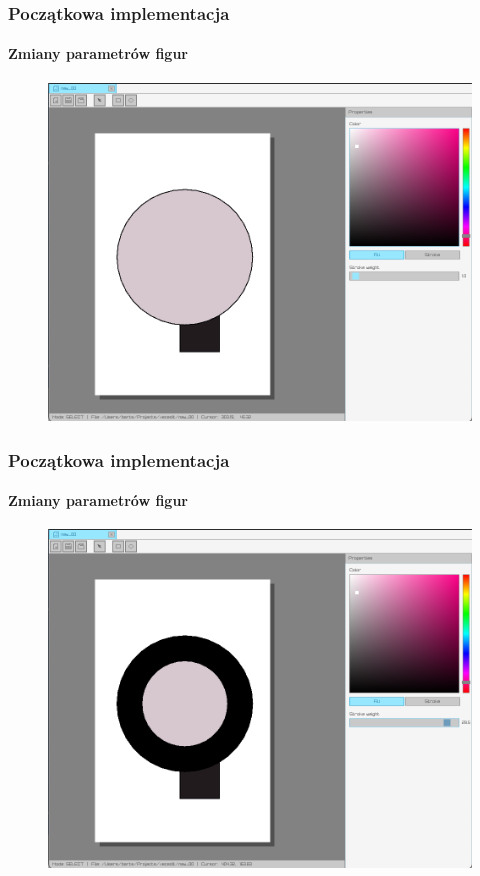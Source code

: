 \documentclass[
	11pt,]{beamer}
\begin{document}
\begin{frame}
	\frametitle{Początkowa implementacja}
	\framesubtitle{Zmiany parametrów figur}
	
	\begin{figure}
		\includegraphics[height=0.7\textheight]{figures/pro7.png}
	\end{figure}
\end{frame}

\begin{frame}
	\frametitle{Początkowa implementacja}
	\framesubtitle{Zmiany parametrów figur}
	
	\begin{figure}
		\includegraphics[height=0.7\textheight]{figures/pro8.png}
	\end{figure}
\end{frame}
\end{document}
